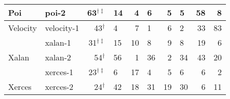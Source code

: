 \begin{figure*}[t]
{{\begin{tabular}{rl|rl|rl|rl|rr|}
\multicolumn{1}{l|}{\multirow{-2}{*}{Poi}}    & poi-2      & \cellcolor[HTML]{C0C0C0}63$^{\dagger\ddagger}$                        & 14                                               & 4            & 6           & 5             & 5             & 58            & 8             \bigstrut[b]\\ \hline
\multicolumn{1}{l|}{Velocity}                 & velocity-1 & \cellcolor[HTML]{C0C0C0}43$^{\dagger}$                        & 4                                                & 7            & 1           & 6             & 2             & 33            & 83            \bigstrut\\ \hline
\multicolumn{1}{l|}{}                         & xalan-1    & \cellcolor[HTML]{C0C0C0}31$^{\dagger\ddagger}$                                              & 15                                               & 10           & 8           & 9             & 8             & 19            & 6             \bigstrut[t]\\
\multicolumn{1}{l|}{\multirow{-2}{*}{Xalan}}  & xalan-2    & 54$^{\dagger}$                                                                      & \cellcolor[HTML]{C0C0C0}56 & 1            & 36          & 2             & 34            & 43            & 20            \bigstrut[b]\\ \hline
\multicolumn{1}{l|}{}                         & xerces-1   & \cellcolor[HTML]{C0C0C0}23$^{\dagger\ddagger}$                                              & 6                                                & 17           & 4           & 5             & 6             & 6             & 2             \bigstrut[t]\\
\multicolumn{1}{l|}{\multirow{-2}{*}{Xerces}} & xerces-2   & 24$^{\dagger}$                                                                      & \cellcolor[HTML]{C0C0C0}42 & 18           & 31          & 19            & 30            & 6             & 11  \bigstrut[b]\\       
\end{tabular}}
\label{subfig:wp}}%
\end{figure*}
